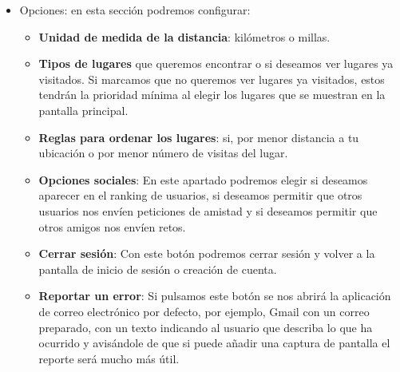\begin{itemize}
\begin{itemize}
    \item Opciones: en esta sección podremos configurar:
    \begin{itemize}
        \item \textbf{Unidad de medida de la distancia}: kilómetros o millas.
        
        \item \textbf{Tipos de lugares} que queremos encontrar o si deseamos ver lugares ya visitados. Si marcamos que no queremos ver lugares ya visitados, estos tendrán la prioridad mínima al elegir los lugares que se muestran en la pantalla principal.
        
        \item \textbf{Reglas para ordenar los lugares}: si, por menor distancia a tu ubicación o por menor número de visitas del lugar.
        
        \item \textbf{Opciones sociales}: En este apartado podremos elegir si deseamos aparecer en el ranking de usuarios, si deseamos permitir que otros usuarios nos envíen peticiones de amistad y si deseamos permitir que otros amigos nos envíen retos.
        
        \item \textbf{Cerrar sesión}: Con este botón podremos cerrar sesión y volver a la pantalla de inicio de sesión o creación de cuenta.
        
        \item \textbf{Reportar un error}: Si pulsamos este botón se nos abrirá la aplicación de correo electrónico por defecto, por ejemplo, Gmail con un correo preparado, con un texto indicando al usuario que describa lo que ha ocurrido y avisándole de que si puede añadir una captura de pantalla el reporte será mucho más útil.
        
    \end{itemize}
\end{itemize}


\end{itemize}

